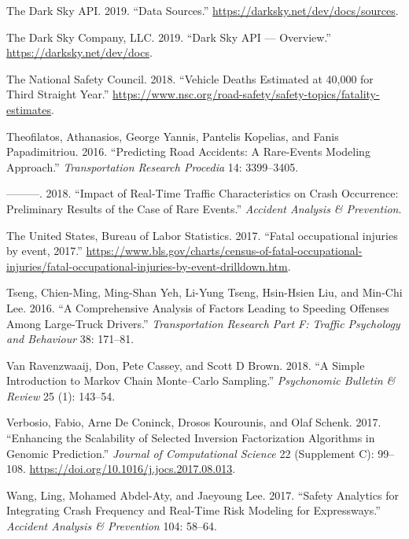 \documentclass[12pt]{book}
\numberwithin{equation}{chapter}
\begin{document}
\leavevmode\hypertarget{ref-darkskyds}{}%
The Dark Sky API. 2019. ``Data Sources.'' \url{https://darksky.net/dev/docs/sources}.

\leavevmode\hypertarget{ref-darksky}{}%
The Dark Sky Company, LLC. 2019. ``Dark Sky API --- Overview.'' \url{https://darksky.net/dev/docs}.

\leavevmode\hypertarget{ref-nsc2018}{}%
The National Safety Council. 2018. ``Vehicle Deaths Estimated at 40,000 for Third Straight Year.'' \url{https://www.nsc.org/road-safety/safety-topics/fatality-estimates}.

\leavevmode\hypertarget{ref-theofilatos2016predicting}{}%
Theofilatos, Athanasios, George Yannis, Pantelis Kopelias, and Fanis Papadimitriou. 2016. ``Predicting Road Accidents: A Rare-Events Modeling Approach.'' \emph{Transportation Research Procedia} 14: 3399--3405.

\leavevmode\hypertarget{ref-theofilatos2018impact}{}%
---------. 2018. ``Impact of Real-Time Traffic Characteristics on Crash Occurrence: Preliminary Results of the Case of Rare Events.'' \emph{Accident Analysis \& Prevention}.

\leavevmode\hypertarget{ref-bols}{}%
The United States, Bureau of Labor Statistics. 2017. ``Fatal occupational injuries by event, 2017.'' \url{https://www.bls.gov/charts/census-of-fatal-occupational-injuries/fatal-occupational-injuries-by-event-drilldown.htm}.

\leavevmode\hypertarget{ref-tseng2016comprehensive}{}%
Tseng, Chien-Ming, Ming-Shan Yeh, Li-Yung Tseng, Hsin-Hsien Liu, and Min-Chi Lee. 2016. ``A Comprehensive Analysis of Factors Leading to Speeding Offenses Among Large-Truck Drivers.'' \emph{Transportation Research Part F: Traffic Psychology and Behaviour} 38: 171--81.

\leavevmode\hypertarget{ref-van2018simple}{}%
Van Ravenzwaaij, Don, Pete Cassey, and Scott D Brown. 2018. ``A Simple Introduction to Markov Chain Monte--Carlo Sampling.'' \emph{Psychonomic Bulletin \& Review} 25 (1): 143--54.

\leavevmode\hypertarget{ref-Verbosio2017}{}%
Verbosio, Fabio, Arne De Coninck, Drosos Kourounis, and Olaf Schenk. 2017. ``Enhancing the Scalability of Selected Inversion Factorization Algorithms in Genomic Prediction.'' \emph{Journal of Computational Science} 22 (Supplement C): 99--108. \url{https://doi.org/10.1016/j.jocs.2017.08.013}.

\leavevmode\hypertarget{ref-wang2017safety}{}%
Wang, Ling, Mohamed Abdel-Aty, and Jaeyoung Lee. 2017. ``Safety Analytics for Integrating Crash Frequency and Real-Time Risk Modeling for Expressways.'' \emph{Accident Analysis \& Prevention} 104: 58--64.
\end{document}
